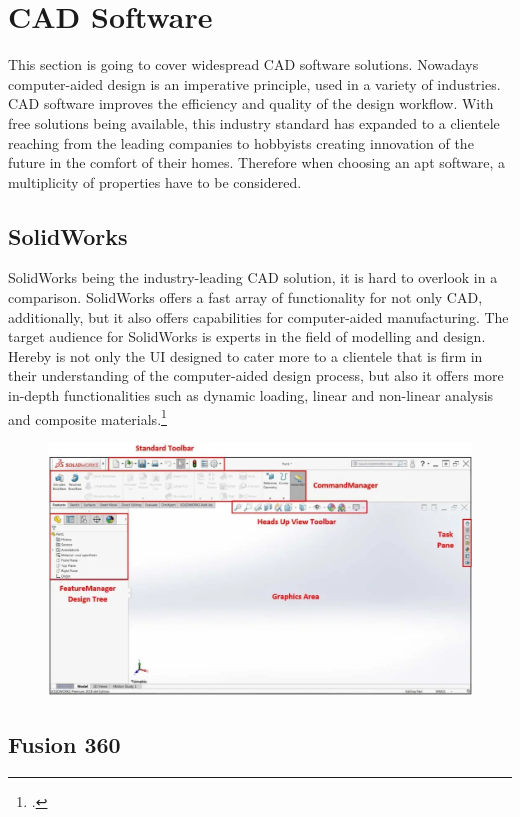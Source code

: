 \section{CAD Software}

This section is going to cover widespread CAD software solutions. Nowadays computer-aided design is an imperative principle, used in a variety of industries. CAD software improves the efficiency and quality of the design workflow. With free solutions being available, this industry standard has expanded to a clientele reaching from the leading companies to hobbyists creating innovation of the future in the comfort of their homes. Therefore when choosing an apt software, a multiplicity of properties have to be considered.

\subsection{SolidWorks}

SolidWorks being the industry-leading CAD solution, it is hard to overlook in a comparison. SolidWorks offers a fast array of functionality for not only CAD, additionally, but it also offers capabilities for computer-aided manufacturing. 
The target audience for SolidWorks is experts in the field of modelling and design. Hereby is not only the UI designed to cater more to a clientele that is firm in their understanding of the computer-aided design process, but also it offers more in-depth functionalities such as dynamic loading, linear and non-linear analysis and composite materials.\footcite{all3dpSolidWorksVsFusion2021}

\begin{figure}[h]
	\centering
	\includegraphics[width=0.6\linewidth]{img/SolidWorksUI}
	\caption{}
	\label{fig:custom_parts_solidworks}
\end{figure}


\subsection{Fusion 360}

